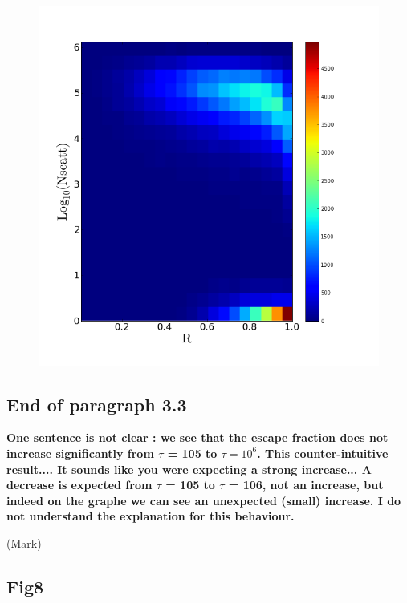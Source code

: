 \documentclass[12pt]{article}
\begin{document}
\begin{figure}
  \includegraphics[scale=0.4]{Histogram2dNscattVSRadius.png}
\end{figure}


\subsection*{End of paragraph 3.3}

{\bf One sentence is not clear : we see that the escape fraction does not increase significantly from $\tau$ = 105 to $\tau = 10^{6}$. This counter-intuitive result.... It sounds like you were expecting a strong increase... A decrease is expected from $\tau$ = 105 to $\tau$ = 106, not an increase, but indeed on the graphe we can see an unexpected (small) increase. I do not understand the explanation for this behaviour.}


(Mark)

\subsection*{Fig8}
\end{document}

